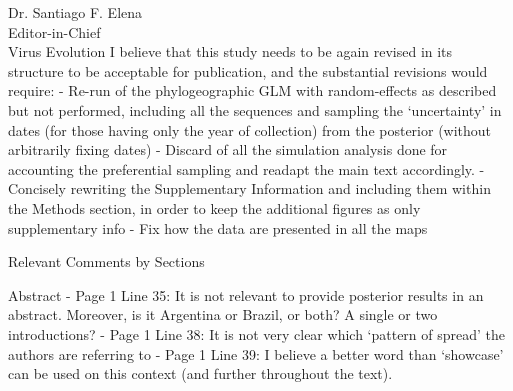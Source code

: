 \documentclass[12pt, a4paper]{letter} %
\begin{document}
\begin{letter}{
	Dr. Santiago F. Elena\\
    Editor-in-Chief \\
    Virus Evolution
}
I believe that this study needs to be again revised in its structure to be acceptable for publication, and the substantial revisions would require:
-       Re-run of the phylogeographic GLM with random-effects as described but not performed, including all the sequences and sampling the ‘uncertainty’ in dates (for those having only the year of collection) from the posterior (without arbitrarily fixing dates)
-       Discard of all the simulation analysis done for accounting the preferential sampling and readapt the main text accordingly.
-       Concisely rewriting the Supplementary Information and including them within the Methods section, in order to keep the additional figures as only supplementary info
-       Fix how the data are presented in all the maps 

Relevant Comments by Sections

Abstract
-       Page 1 Line 35: It is not relevant to provide posterior results in an abstract. Moreover, is it Argentina or Brazil, or both? A single or two introductions?
-       Page 1 Line 38: It is not very clear which ‘pattern of spread’ the authors are referring to
-       Page 1 Line 39: I believe a better word than ‘showcase’ can be used on this context (and further throughout the text).


\end{letter}
\end{document}
